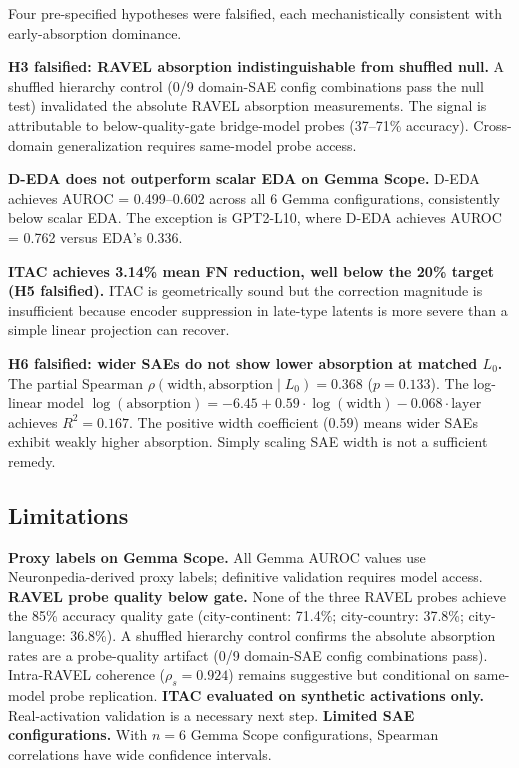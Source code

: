 \documentclass{article}
\begin{document}
Four pre-specified hypotheses were falsified, each mechanistically consistent with early-absorption dominance.

\textbf{H3 falsified: RAVEL absorption indistinguishable from shuffled null.} A shuffled hierarchy control (0/9 domain-SAE config combinations pass the null test) invalidated the absolute RAVEL absorption measurements. The signal is attributable to below-quality-gate bridge-model probes (37--71\% accuracy). Cross-domain generalization requires same-model probe access.

\textbf{D-EDA does not outperform scalar EDA on Gemma Scope.} D-EDA achieves AUROC = 0.499--0.602 across all 6 Gemma configurations, consistently below scalar EDA. The exception is GPT2-L10, where D-EDA achieves AUROC = 0.762 versus EDA's 0.336.

\textbf{ITAC achieves 3.14\% mean FN reduction, well below the 20\% target (H5 falsified).} ITAC is geometrically sound but the correction magnitude is insufficient because encoder suppression in late-type latents is more severe than a simple linear projection can recover.

\textbf{H6 falsified: wider SAEs do not show lower absorption at matched $L_0$.} The partial Spearman $\rho(\text{width}, \text{absorption} \mid L_0) = 0.368$ ($p = 0.133$). The log-linear model $\log(\text{absorption}) = -6.45 + 0.59 \cdot \log(\text{width}) - 0.068 \cdot \text{layer}$ achieves $R^2 = 0.167$. The positive width coefficient (0.59) means wider SAEs exhibit weakly higher absorption. Simply scaling SAE width is not a sufficient remedy.

\subsection{Limitations}

\textbf{Proxy labels on Gemma Scope.} All Gemma AUROC values use Neuronpedia-derived proxy labels; definitive validation requires model access. \textbf{RAVEL probe quality below gate.} None of the three RAVEL probes achieve the 85\% accuracy quality gate (city-continent: 71.4\%; city-country: 37.8\%; city-language: 36.8\%). A shuffled hierarchy control confirms the absolute absorption rates are a probe-quality artifact (0/9 domain-SAE config combinations pass). Intra-RAVEL coherence ($\rho_s = 0.924$) remains suggestive but conditional on same-model probe replication. \textbf{ITAC evaluated on synthetic activations only.} Real-activation validation is a necessary next step. \textbf{Limited SAE configurations.} With $n = 6$ Gemma Scope configurations, Spearman correlations have wide confidence intervals.
\end{document}
